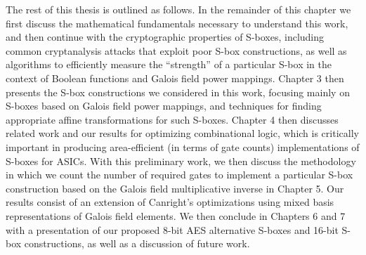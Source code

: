 The rest of this thesis is outlined as follows. In the remainder of this chapter we first discuss the mathematical fundamentals necessary to understand this work, and then continue with the cryptographic properties of S-boxes, including common cryptanalysis attacks that exploit poor S-box constructions, as well as algorithms to efficiently measure the ``strength'' of a particular S-box in the context of Boolean functions and Galois field power mappings. Chapter 3 then presents the S-box constructions we considered in this work, focusing mainly on S-boxes based on Galois field power mappings, and techniques for finding appropriate affine transformations for such S-boxes. Chapter 4 then discusses related work and our results for optimizing combinational logic, which is critically important in producing area-efficient (in terms of gate counts) implementations of S-boxes for ASICs. With this preliminary work, we then discuss the methodology in which we count the number of required gates to implement a particular S-box construction based on the Galois field multiplicative inverse in Chapter 5. Our results consist of an extension of Canright's \cite{Canright05-1} optimizations using mixed basis representations of Galois field elements. We then conclude in Chapters 6 and 7 with a presentation of our proposed 8-bit AES alternative S-boxes and 16-bit S-box constructions, as well as a discussion of future work. 
